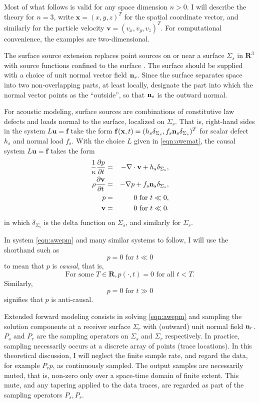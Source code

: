 \documentclass[georeport,12pt]{geophysics}
\newcommand{\bx}{\mathbf{x}}
\newcommand{\bv}{\mathbf{v}}
\newcommand{\bff}{\mathbf{f}}
\newcommand{\bu}{\mathbf{u}}
\newcommand{\bR}{\mathbf{R}}
\begin{document}
Most of what follows is valid for any space dimension $n >0$. I will
describe the theory for $n=3$, write $\bx=(x,y,z)^T$ for the spatial
coordinate vector, and similarly for the 
particle velocity $\bv = (v_x,v_y,v_z)^T$. For computational convenience, the
examples are two-dimensional.

The surface source extension replaces point sources on or near a
surface $\Sigma_s$ in $\bR^3$ with source functions confined to the
surface . The surface should be supplied with a choice of unit normal
vector field ${\bf n}_s$. Since the surface separates space into two
non-overlapping parts, at least locally, designate the part into which
the normal vector points as the ``outside'', so that ${\bf n}_s$ is
the outward normal.

For
acoustic modeling, surface sources are combinations of constitutive law
defects and loads normal to the surface, localized on $\Sigma_s$. That
is, right-hand sides in the system $L\bu=\bff$ take the form
$\bff(\bx,t) = (h_s\delta_{\Sigma_s},
f_s{\bf n}_s\delta_{\Sigma_s})^T$ for scalar defect $h_s$ and normal
load $f_s$. With the choice $L$ given in
\ref{eqn:awemat}, the causal system $L\bu=\bff$
takes the form
\begin{eqnarray}
\label{eqn:awepm}
\frac{1}{\kappa}\frac{\partial p}{\partial t} & = & - \nabla \cdot \bv +
h_s \delta_{\Sigma_s}, \nonumber \\
\rho\frac{\partial \bv}{\partial t} & = & - \nabla p +
                                                f_s{\bf n}_s \delta_{\Sigma_s},\nonumber \\
p & =& 0 \mbox{ for }  t \ll 0,\nonumber\\ 
\bv & = & 0 \mbox{ for } t \ll 0.
\end{eqnarray}
in which $\delta_{\Sigma_s}$ is the delta function on $\Sigma_s$, and
similarly for $\Sigma_r$. 

 In system \ref{eqn:awepm} and many similar
systems to follow, I will use the shorthand such as
\[
  p = 0 \mbox{ for } t \ll 0 
\]
to mean that $p$ is {\em causal}, that is,
\[
  \mbox{For some } T \in \bR, p(\cdot,t) = 0 \mbox{ for all } t <
  T.
\]
Similarly,
\[
  p = 0 \mbox{ for } t \gg 0 
\]
signifies that $p$ is anti-causal.

Extended forward modeling consists in solving \ref{eqn:awepm} and
sampling the solution components at a receiver surface $\Sigma_r$ with
(outward) unit normal field ${\bf n}_r$.
$P_s$ and $P_r$ are the sampling operators on $\Sigma_s$ and
$\Sigma_r$ respectively. In
practice, sampling necessarily occurs at a discrete array of points
(trace locations). In this
theoretical discussion, I will neglect the finite sample rate, and
regard the data, for example $P_rp$, as continuously sampled. The
output samples are necessarily muted, that is, non-zero only over a space-time domain
of finite extent. This mute, and any tapering applied to the data
traces, are regarded as part of the sampling operators $P_s,P_r$.
\end{document}
